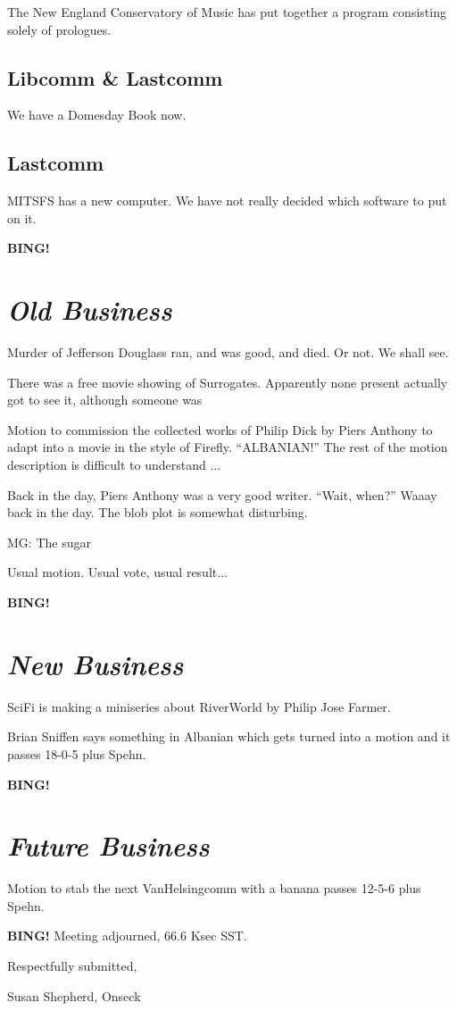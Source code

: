 \documentclass[10pt]{article}
\newcommand{\bing}{{\bf BING!} }
\newcommand{\goto}[1]{\bing \vskip 12pt \section*{{\em{#1}}}}
\newcommand{\ps}{ plus Spehn\xspace}
\begin{document}
The New England Conservatory of Music has put together a program consisting solely of prologues.

\subsection*{Libcomm & Lastcomm}
We have a Domesday Book now.

\subsection*{Lastcomm}
MITSFS has a new computer. We have not really decided which software to put on it.

\goto{Old Business}
Murder of Jefferson Douglass ran, and was good, and died. Or not. We shall see.

There was a free movie showing of Surrogates. Apparently none present actually got to see it, although someone was

Motion to commission the collected works of Philip Dick by Piers Anthony to adapt into a movie in the style of Firefly. ``ALBANIAN!'' The rest of the motion description is difficult to understand ...

Back in the day, Piers Anthony was a very good writer. ``Wait, when?'' Waaay back in the day. The blob plot is somewhat disturbing. 

MG: The sugar

Usual motion. Usual vote, usual result...

\goto{New Business}

SciFi is making a miniseries about RiverWorld by Philip Jose Farmer.

Brian Sniffen says something in Albanian which gets turned into a motion and it passes 18-0-5\ps.

\goto{Future Business}

Motion to stab the next VanHelsingcomm with a banana passes 12-5-6\ps.

\bing
\noindent
Meeting adjourned, 66.6 Ksec SST.

\vspace{18pt}

\centerline{Respectfully submitted,}
\centerline{Susan Shepherd, Onseck}
\end{document}
